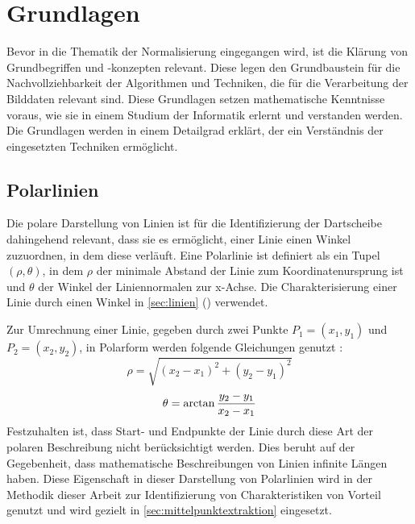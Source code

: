 
\newpage
\section{Grundlagen}
\label{sec:cv:grundlagen}

Bevor in die Thematik der Normalisierung eingegangen wird, ist die Klärung von Grundbegriffen und -konzepten relevant. Diese legen den Grundbaustein für die Nachvollziehbarkeit der Algorithmen und Techniken, die für die Verarbeitung der Bilddaten relevant sind. Diese Grundlagen setzen mathematische Kenntnisse voraus, wie sie in einem Studium der Informatik erlernt und verstanden werden. Die Grundlagen werden in einem Detailgrad erklärt, der ein Verständnis der eingesetzten Techniken ermöglicht.


\subsection{Polarlinien}
\label{sec:polarlinien}

Die polare Darstellung von Linien ist für die Identifizierung der Dartscheibe dahingehend relevant, dass sie es ermöglicht, einer Linie einen Winkel zuzuordnen, in dem diese verläuft. Eine Polarlinie ist definiert als ein Tupel $(\rho, \theta)$, in dem $\rho$ der minimale Abstand der Linie zum Koordinatenursprung ist und $\theta$ der Winkel der Liniennormalen zur x-Achse. Die Charakterisierung einer Linie durch einen Winkel in \autoref{sec:linien} () verwendet.

Zur Umrechnung einer Linie, gegeben durch zwei Punkte $P_1 = (x_1, y_1)$ und $P_2 = (x_2, y_2)$, in Polarform werden folgende Gleichungen genutzt \cite{polar_linien}:
\[ \rho = \sqrt{(x_2 - x_1)^2 + (y_2 - y_1)^2} \]
\[ \theta = \operatorname{arctan} \frac{y_2 - y_1}{x_2 - x_1} \]
Festzuhalten ist, dass Start- und Endpunkte der Linie durch diese Art der polaren Beschreibung nicht berücksichtigt werden. Dies beruht auf der Gegebenheit, dass mathematische Beschreibungen von Linien infinite Längen haben. Diese Eigenschaft in dieser Darstellung von Polarlinien wird in der Methodik dieser Arbeit zur Identifizierung von Charakteristiken von Vorteil genutzt und wird gezielt in \autoref{sec:mittelpunktextraktion} eingesetzt.


